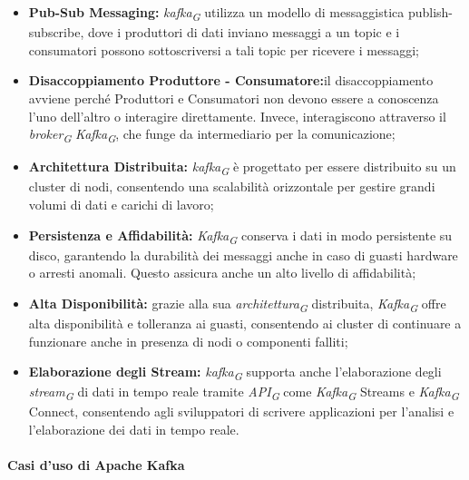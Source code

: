 \begin{itemize}
  \item \textbf{Pub-Sub Messaging:} \textit{kafka}\textsubscript{\textit{G}} utilizza un modello di messaggistica publish-subscribe, dove i produttori di dati inviano messaggi a un topic e i consumatori possono sottoscriversi a tali topic per ricevere i messaggi;
  \item \textbf{Disaccoppiamento Produttore - Consumatore:}il disaccoppiamento avviene perché Produttori e Consumatori non devono essere a conoscenza l'uno dell'altro o interagire direttamente. Invece, interagiscono attraverso il \textit{broker}\textsubscript{\textit{G}} \textit{Kafka}\textsubscript{\textit{G}}, che funge da intermediario per la comunicazione;
  \item \textbf{Architettura Distribuita:} \textit{kafka}\textsubscript{\textit{G}} è progettato per essere distribuito su un cluster di nodi, consentendo una scalabilità orizzontale per gestire grandi volumi di dati e carichi di lavoro;
  
  \item \textbf{Persistenza e Affidabilità:} \textit{Kafka}\textsubscript{\textit{G}} conserva i dati in modo persistente su disco, garantendo la durabilità dei messaggi anche in caso di guasti hardware o arresti anomali. Questo assicura anche un alto livello di affidabilità;
  
  \item \textbf{Alta Disponibilità:} grazie alla sua \textit{architettura}\textsubscript{\textit{G}} distribuita, \textit{Kafka}\textsubscript{\textit{G}} offre alta disponibilità e tolleranza ai guasti, consentendo ai cluster di continuare a funzionare anche in presenza di nodi o componenti falliti;
  
  \item \textbf{Elaborazione degli Stream:} \textit{kafka}\textsubscript{\textit{G}} supporta anche l'elaborazione degli \textit{stream}\textsubscript{\textit{G}} di dati in tempo reale tramite \textit{API}\textsubscript{\textit{G}} come \textit{Kafka}\textsubscript{\textit{G}} Streams e \textit{Kafka}\textsubscript{\textit{G}} Connect, consentendo agli sviluppatori di scrivere applicazioni per l'analisi e l'elaborazione dei dati in tempo reale.
\end{itemize}

\paragraph{Casi d'uso di Apache Kafka}

